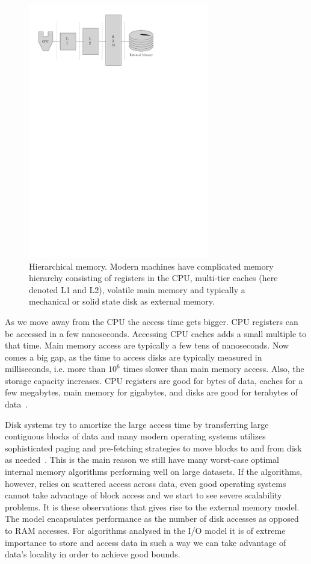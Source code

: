 \documentclass[twoside,11pt,openright]{report}
\begin{document}
\begin{figure}
	\centering
		\includegraphics[width=0.7\textwidth]{../figures/real_computer}
	\caption{Hierarchical memory. Modern machines have complicated memory hierarchy consisting of registers in the CPU, multi-tier caches (here denoted L1 and L2), volatile main memory and typically a mechanical or solid state disk as external memory.}
	\label{fig:real_computer}
\end{figure}

As we move away from the CPU the access time gets bigger. CPU registers can be accessed in a few nanoseconds. Accessing CPU caches adds a small multiple to that time. Main memory access are typically a few tens of nanoseconds. Now comes a big gap, as the time to access disks are typically measured in milliseconds, i.e. more than $10^6$ times slower than main memory access. Also, the storage capacity increases. CPU registers are good for bytes of data, caches for a few megabytes, main memory for gigabytes, and disks are good for terabytes of data~\cite{Tanenbaum:1998:SCO:552473}.

Disk systems try to amortize the large access time by transferring large contiguous blocks of data and many modern operating systems utilizes sophisticated paging and pre-fetching strategies to move blocks to and from disk as needed~\cite{Tanenbaum:2007:MOS:1410217}. This is the main reason we still have many worst-case optimal internal memory algorithms performing well on large datasets. If the algorithms, however, relies on scattered access across data, even good operating systems cannot take advantage of block access and we start to see severe scalability problems. It is these observations that gives rise to the external memory model. The model encapsulates performance as the number of disk accesses as opposed to RAM accesses. For algorithms analysed in the I/O model it is of extreme importance to store and access data in such a way we can take advantage of data's locality in order to achieve good bounds.
\end{document}

